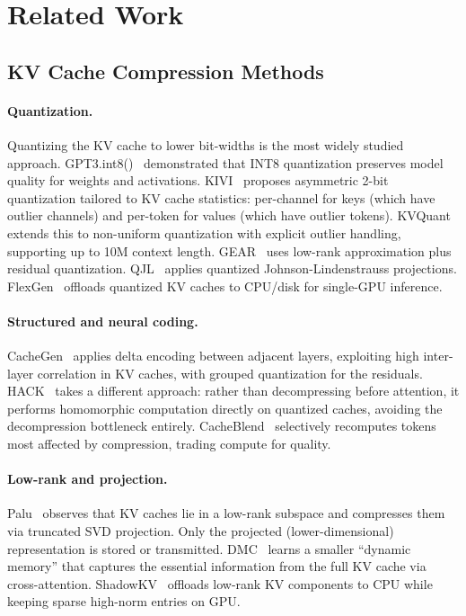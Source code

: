 \documentclass{article}
\begin{document}
\section{Related Work}
\label{sec:related}

\subsection{KV Cache Compression Methods}

\paragraph{Quantization.} Quantizing the KV cache to lower bit-widths is the most widely studied approach. GPT3.int8()~\citep{dettmers2022gptint8} demonstrated that INT8 quantization preserves model quality for weights and activations. KIVI~\citep{liu2024kivi} proposes asymmetric 2-bit quantization tailored to KV cache statistics: per-channel for keys (which have outlier channels) and per-token for values (which have outlier tokens). KVQuant~\citep{hooper2024kvquant} extends this to non-uniform quantization with explicit outlier handling, supporting up to 10M context length. GEAR~\citep{kang2024gear} uses low-rank approximation plus residual quantization. QJL~\citep{zandieh2024qjl} applies quantized Johnson-Lindenstrauss projections. FlexGen~\citep{sheng2023flexgen} offloads quantized KV caches to CPU/disk for single-GPU inference.

\paragraph{Structured and neural coding.} CacheGen~\citep{liu2024cachegen} applies delta encoding between adjacent layers, exploiting high inter-layer correlation in KV caches, with grouped quantization for the residuals. HACK~\citep{hack2025} takes a different approach: rather than decompressing before attention, it performs homomorphic computation directly on quantized caches, avoiding the decompression bottleneck entirely. CacheBlend~\citep{yao2024cacheblend} selectively recomputes tokens most affected by compression, trading compute for quality.

\paragraph{Low-rank and projection.} Palu~\citep{palu2025} observes that KV caches lie in a low-rank subspace and compresses them via truncated SVD projection. Only the projected (lower-dimensional) representation is stored or transmitted. DMC~\citep{nawrot2024dmc} learns a smaller ``dynamic memory'' that captures the essential information from the full KV cache via cross-attention. ShadowKV~\citep{sun2024shadowkv} offloads low-rank KV components to CPU while keeping sparse high-norm entries on GPU.
\end{document}
